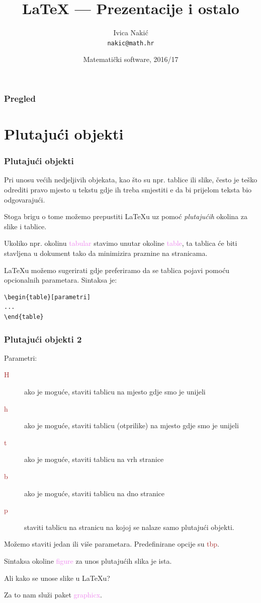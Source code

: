 \documentclass{beamer}
\title{\LaTeX{} --- Prezentacije i ostalo}
\subtitle{}
\author{Ivica Nakić \\ \texttt{nakic@math.hr}}
\institute[PMF--MO]{Matematički odsjek Prirodoslovno--matematičkog fakulteta}
\date[2016/17]{Matematički software, 2016/17}
\theoremstyle{remark}
\theoremstyle{definition}
\begin{document}
\begin{frame}
  \maketitle  
\end{frame}

\begin{frame}
\frametitle{Pregled}
  \tableofcontents  
\end{frame}

\section{Plutajući objekti}

\begin{frame}[fragile]
\frametitle{Plutajući objekti}
Pri unosu većih nedjeljivih objekata, kao što su npr. tablice ili slike, često je teško odrediti pravo mjesto u tekstu gdje ih treba smjestiti e da bi prijelom teksta bio odgovarajući.

Stoga brigu o tome možemo prepustiti \LaTeX{}u uz pomoć \emph{plutajućih} okolina za slike i tablice. 

Ukoliko npr. okolinu \textcolor{violet}{tabular} stavimo unutar okoline \textcolor{violet}{table}, ta tablica će biti stavljena u dokument tako da minimizira praznine na stranicama.

\LaTeX{}u možemo sugerirati gdje preferiramo da se tablica pojavi pomoću opcionalnih parametara. Sintaksa je:
\begin{lstlisting}
\begin{table}[parametri]
...
\end{table}
\end{lstlisting}
\end{frame}

\begin{frame}
\frametitle{Plutajući objekti 2}
Parametri:
\begin{description}
\item[\textcolor{brown}{H}] ako je moguće, staviti tablicu na mjesto gdje smo je unijeli
\item[\textcolor{brown}{h}] ako je moguće, staviti tablicu (otprilike) na mjesto gdje smo je unijeli
\item[\textcolor{brown}{t}] ako je moguće, staviti tablicu na vrh stranice
\item[\textcolor{brown}{b}] ako je moguće, staviti tablicu na dno stranice
\item[\textcolor{brown}{p}] staviti tablicu na stranicu na kojoj se nalaze samo plutajući objekti.
\end{description}
Možemo staviti jedan ili više parametara. Predefinirane opcije su \textcolor{brown}{tbp}.

Sintaksa okoline \textcolor{violet}{figure} za unos plutajućih slika je ista. 

Ali kako se unose slike u \LaTeX u?

Za to nam služi paket \textcolor{violet}{graphicx}. 
\end{frame}
\end{document}

